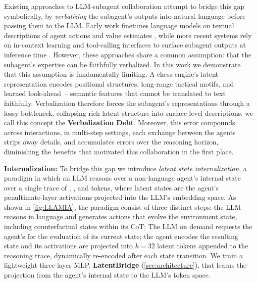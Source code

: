 Existing approaches to LLM-subagent collaboration attempt to bridge this gap symbolically, by \emph{verbalizing} the subagent's outputs into natural language before passing them to the LLM.
Early work finetunes language models on textual descriptions of agent actions and value estimates \citep{zang2019automated, lee2022improving}, while more recent systems rely on in-context learning and tool-calling interfaces to surface subagent outputs at inference time \citep{schick2023toolformerlanguagemodelsteach, yao2022react, kim2024bridging}.
However, these approaches share a common assumption: that the subagent's expertise can be faithfully verbalized.
In this work we demonstrate that this assumption is fundamentally limiting.
A chess engine's latent representation encodes positional structures, long-range tactical motifs, and learned look-ahead~\citep{jenner2024evidence}-- semantic features that cannot be translated to text faithfully.
Verbalization therefore forces the subagent's representations through a lossy bottleneck, collapsing rich latent structure into surface-level descriptions, we call this concept the \textbf{Verbalization Debt}.
Moreover, this error compounds across interactions, in multi-step settings, each exchange between the agents strips away details, and accumulates errors over the reasoning horizon, diminishing the benefits that motivated this collaboration in the first place.

\textbf{Internalization:} To bridge this gap we introduce \emph{latent state internalization}, a paradigm in which an LLM reasons over a non-language agent's internal state over a single trace of , , and  tokens, where latent states are the agent's penultimate-layer activations projected into the LLM's embedding space. As shown in \cref{fig:LLAMIA}, the paradigm consist of three distinct steps:  the LLM reasons in language and generates actions that evolve the environment state, including counterfactual states within its CoT; The LLM on demand requests the agent's for the evaluation of its current state;  the agent encodes the resulting state and its activations are projected into $k{=}32$ latent tokens appended to the reasoning trace, dynamically re-encoded after each state transition. We train a lightweight three-layer MLP, \textbf{LatentBridge} (\cref{sec:architecture}), that learns the projection from the agent's internal state to the LLM's token space.

